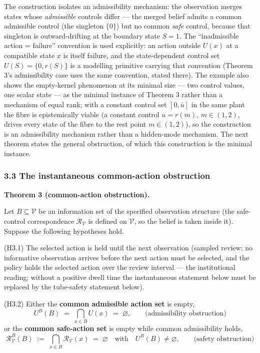 \documentclass[11pt]{article}
\begin{document}
The construction isolates an admissibility mechanism: the observation merges states whose \emph{admissible}
controls differ --- the merged belief admits a common admissible control
(the singleton \(\{0\}\)) but no common \emph{safe} control, because
that singleton is outward-drifting at the boundary state \(S = 1\). The
``inadmissible action = failure'' convention is used explicitly: an action outside \(U(x)\) at a compatible state \(x\) is
itself failure, and the state-dependent control set
\(U(S) = \{0, r(S)\}\) is a modelling primitive carrying that convention
(Theorem 3's admissibility case uses the same convention, stated there).
The example also shows the empty-kernel phenomenon at its minimal size
--- two control values, one scalar state --- as the minimal instance of
Theorem 3 rather than a mechanism of equal rank; with a constant control
set \([0, \bar u]\) in the same plant the fibre is epistemically viable
(a constant control \(u = r(m)\), \(m \in (1,2)\), drives every state of
the fibre to the rest point \(m \in (1,2)\)), so the construction is an admissibility mechanism rather than a hidden-mode mechanism. The next
theorem states the general obstruction, of which this construction is
the minimal instance.

\subsubsection{3.3 The instantaneous common-action
obstruction}\label{the-instantaneous-common-action-obstruction}

\textbf{Theorem 3 (common-action obstruction).}

Let \(B \subseteq \mathcal{V}\) be an information set of the specified observation structure (the safe-control correspondence
\(\mathcal{R}_{\mathcal{V}}\) is defined on \(\mathcal{V}\), so the
belief is taken inside it). Suppose the following hypotheses hold.

(H3.1) The selected action is held until the next observation (sampled
review: no informative observation arrives before the next action must
be selected, and the policy holds the selected action over the review
interval --- the institutional reading; without a positive dwell time
the instantaneous statement below must be replaced by the tube-safety statement below).

(H3.2) Either the \textbf{common admissible action set} is empty,
\[U^B(B) \;=\; \bigcap_{x \in B} U(x) \;=\; \varnothing, \qquad \text{(admissibility obstruction)}\]
or the \textbf{common safe-action set} is empty while common
admissibility holds,
\[\mathcal{R}_{\mathcal{V}}^B(B) \;:=\; \bigcap_{x \in B} \mathcal{R}_{\mathcal{V}}(x) \;=\; \varnothing \quad \text{with} \quad U^B(B) \neq \varnothing, \tag{2} \qquad \text{(safety obstruction)}\]
\end{document}
